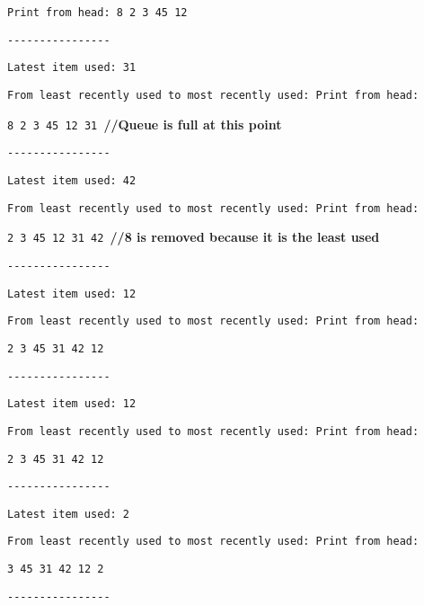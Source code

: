 \begin{minipage}[t]{1\columnwidth}
\texttt{Print from head: 8 2 3 45 12 }

\texttt{-{}-{}-{}-{}-{}-{}-{}-{}-{}-{}-{}-{}-{}-{}-{}- }

\texttt{Latest item used: 31 }

\texttt{From least recently used to most recently used: Print from
head: }

\texttt{8 2 3 45 12 31 }\textbf{//Queue is full at this point}

\texttt{-{}-{}-{}-{}-{}-{}-{}-{}-{}-{}-{}-{}-{}-{}-{}- }

\texttt{Latest item used: 42 }

\texttt{From least recently used to most recently used: Print from
head: }

\texttt{2 3 45 12 31 42 }\textbf{//8 is removed because it is the
least used }

\texttt{-{}-{}-{}-{}-{}-{}-{}-{}-{}-{}-{}-{}-{}-{}-{}- }

\texttt{Latest item used: 12 }

\texttt{From least recently used to most recently used: Print from
head: }

\texttt{2 3 45 31 42 12 }

\texttt{-{}-{}-{}-{}-{}-{}-{}-{}-{}-{}-{}-{}-{}-{}-{}- }

\texttt{Latest item used: 12 }

\texttt{From least recently used to most recently used: Print from
head:}

\texttt{2 3 45 31 42 12 }

\texttt{-{}-{}-{}-{}-{}-{}-{}-{}-{}-{}-{}-{}-{}-{}-{}- }

\texttt{Latest item used: 2 }

\texttt{From least recently used to most recently used: Print from
head: }

\texttt{3 45 31 42 12 2 }

\texttt{-{}-{}-{}-{}-{}-{}-{}-{}-{}-{}-{}-{}-{}-{}-{}- }%
\end{minipage}